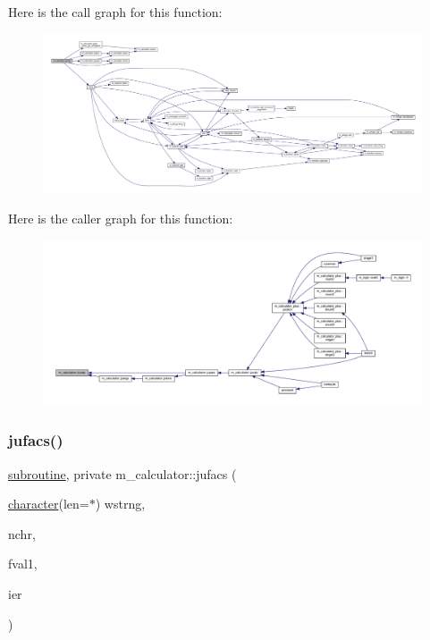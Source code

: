 Here is the call graph for this function\+:
\nopagebreak
\begin{figure}[H]
\begin{center}
\leavevmode
\includegraphics[width=350pt]{namespacem__calculator_a1461bad85da11d09210daefe3f80973d_cgraph}
\end{center}
\end{figure}
Here is the caller graph for this function\+:
\nopagebreak
\begin{figure}[H]
\begin{center}
\leavevmode
\includegraphics[width=350pt]{namespacem__calculator_a1461bad85da11d09210daefe3f80973d_icgraph}
\end{center}
\end{figure}
\mbox{\label{namespacem__calculator_a78c73098f0fcf1130ea9f5f3748bef7d}} 
\subsubsection{\texorpdfstring{jufacs()}{jufacs()}}
{\footnotesize\ttfamily \hyperlink{M__stopwatch_83_8txt_acfbcff50169d691ff02d4a123ed70482}{subroutine}, private m\+\_\+calculator\+::jufacs (\begin{DoxyParamCaption}\item[{\hyperlink{option__stopwatch_83_8txt_abd4b21fbbd175834027b5224bfe97e66}{character}(len=$\ast$)}]{wstrng,  }\item[{}]{nchr,  }\item[{}]{fval1,  }\item[{}]{ier }\end{DoxyParamCaption})\hspace{0.3cm}{\ttfamily [private]}}



